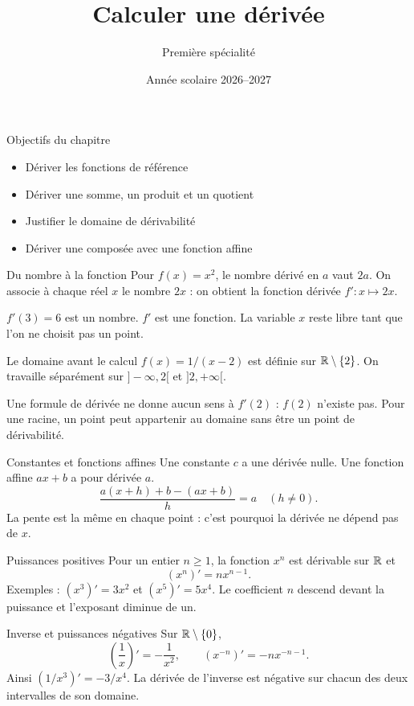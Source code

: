 \documentclass[aspectratio=169,12pt]{beamer}
\title{Calculer une dérivée}
\subtitle{Première spécialité}
\date{Année scolaire 2026--2027}
\begin{document}
\begin{frame}\titlepage\end{frame}
\begin{frame}{Objectifs du chapitre}\begin{itemize}
\item Dériver les fonctions de référence
\item Dériver une somme, un produit et un quotient
\item Justifier le domaine de dérivabilité
\item Dériver une composée avec une fonction affine
\end{itemize}\end{frame}
\renewcommand{\slidekind}{COMPRENDRE}
\begin{frame}[t,fragile]{Du nombre à la fonction}
Pour $f(x)=x^2$, le nombre dérivé en $a$ vaut $2a$. On associe à chaque réel $x$ le nombre $2x$ : on obtient la fonction dérivée $f\prime:x\mapsto2x$.\medskip\par $f\prime(3)=6$ est un nombre. $f\prime$ est une fonction. La variable $x$ reste libre tant que l’on ne choisit pas un point.
\end{frame}
\renewcommand{\slidekind}{MÉTHODE \& EXEMPLE}
\begin{frame}[t,fragile]{Le domaine avant le calcul}
$f(x)=1/(x-2)$ est définie sur $\mathbb{R}\setminus\{2\}$. On travaille séparément sur $]-\infty,2[$ et $]2,+\infty[$.\medskip\par Une formule de dérivée ne donne aucun sens à $f\prime(2)$ : $f(2)$ n’existe pas. Pour une racine, un point peut appartenir au domaine sans être un point de dérivabilité.
\end{frame}
\renewcommand{\slidekind}{COMPRENDRE}
\begin{frame}[t,fragile]{Constantes et fonctions affines}
Une constante $c$ a une dérivée nulle. Une fonction affine $ax+b$ a pour dérivée $a$.\[\frac{a(x+h)+b-(ax+b)}h=a\quad(h\ne0).\] La pente est la même en chaque point : c’est pourquoi la dérivée ne dépend pas de $x$.
\end{frame}
\renewcommand{\slidekind}{COMPRENDRE}
\begin{frame}[t,fragile]{Puissances positives}
Pour un entier $n\ge1$, la fonction $x^n$ est dérivable sur $\mathbb{R}$ et\[(x^n)\prime=nx^{n-1}.\] Exemples : $(x^3)\prime=3x^2$ et $(x^5)\prime=5x^4$. Le coefficient $n$ descend devant la puissance et l’exposant diminue de un.
\end{frame}
\renewcommand{\slidekind}{COMPRENDRE}
\begin{frame}[t,fragile]{Inverse et puissances négatives}
Sur $\mathbb{R}\setminus\{0\}$,\[\left(\frac1x\right)\prime=-\frac1{x^2},\qquad (x^{-n})\prime=-n x^{-n-1}.\] Ainsi $(1/x^3)\prime=-3/x^4$. La dérivée de l’inverse est négative sur chacun des deux intervalles de son domaine.
\end{frame}
\end{document}
